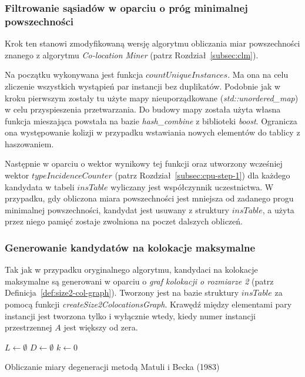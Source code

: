 \documentclass[12pt]{article}
\begin{document}
\subsubsection{Filtrowanie sąsiadów w oparciu o próg minimalnej powszechności}

Krok ten stanowi zmodyfikowaną wersję algorytmu obliczania miar powszechności znanego z algorytmu \textit{Co-location Miner} (patrz Rozdział~\ref{subsec:clm}).

Na początku wykonywana jest funkcja $ countUniqueInstances$. Ma ona na celu zliczenie wszystkich wystąpień par instancji bez duplikatów. Podobnie jak w kroku pierwszym zostały tu użyte mapy nieuporządkowane (\textit{std::unordered\_map}) w celu przyspieszenia przetwarzania. Do budowy mapy została użyta własna funkcja mieszająca powstała na bazie \textit{hash\_combine} z biblioteki \textit{boost}. Ogranicza ona występowanie kolizji w przypadku wstawiania nowych elementów do tablicy z haszowaniem.

Następnie w oparciu o wektor wynikowy tej funkcji oraz utworzony wcześniej wektor $ typeIncidenceCounter$ (patrz Rozdział~\ref{subsec:cpu-step-1}) dla każdego kandydata w tabeli $ insTable $ wyliczany jest współczynnik uczestnictwa. W przypadku, gdy obliczona miara powszechności jest mniejsza od zadanego progu minimalnej powszechności, kandydat jest usuwany z struktury $ insTable $, a użyta przez niego pamięć zostaje zwolniona na poczet dalszych obliczeń.

\subsubsection{Generowanie kandydatów na kolokacje maksymalne}

Tak jak w przypadku oryginalnego algorytmu, kandydaci na kolokacje maksymalne są generowani w oparciu o \textit{graf kolokacji o rozmiarze 2} (patrz Definicja~\ref{def:size2-col-graph}). Tworzony jest na bazie struktury $ insTable $ za pomocą funkcji \textit{createSize2ColocationsGraph}. Krawędź między elementami pary instancji jest tworzona tylko i wyłącznie wtedy, kiedy numer instancji przestrzennej $ A $ jest większy od zera.

\begin{algorithm}
$L \leftarrow \emptyset$\;
$D \leftarrow \emptyset$\;
$k \leftarrow 0$\;
\caption{Obliczanie miary degeneracji metodą Matuli i Becka (1983)}
\label{alg:matusiak}
\end{algorithm}
\end{document}
